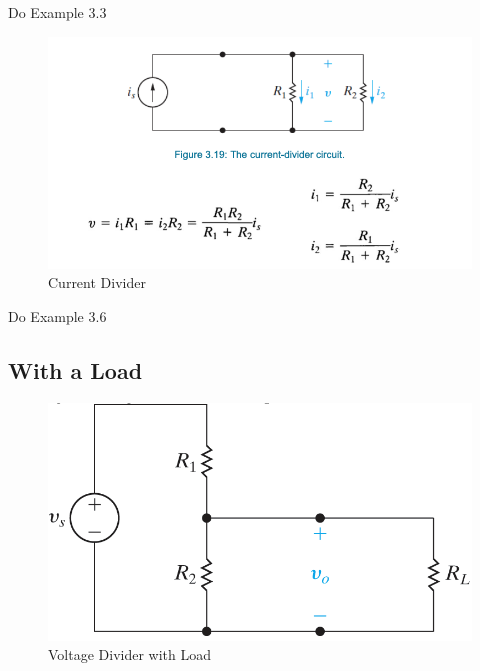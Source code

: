 \documentclass[14pt]{memoir}
\begin{document}
\begin{tcolorbox}
Do Example 3.3
\end{tcolorbox}



\begin{figure}[H]
\begin{center}
\includegraphics[scale=0.50]{fig/fig03_19.png}
\caption{Current Divider}
\label{fig:fig03_19}
\end{center}
\end{figure}

\begin{tcolorbox}
Do Example 3.6
\end{tcolorbox}


\subsection{With a Load}

\begin{figure}[H]
\begin{center}
\includegraphics[scale=0.50]{fig/fig03_17.png}
\caption{Voltage Divider with Load}
\label{fig:fig03_17}
\end{center}
\end{figure}
\end{document}
